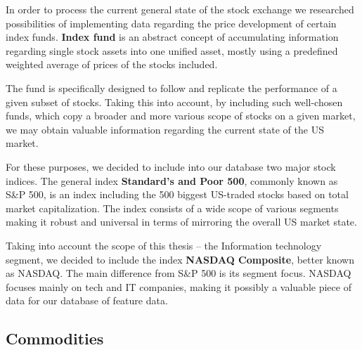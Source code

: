 In order to process the current general state of the stock exchange we researched possibilities of
implementing data regarding the price development of certain index funds. \textbf{Index fund} is an abstract 
concept of accumulating information regarding single stock assets into one unified asset, mostly using a predefined
weighted average of prices of the stocks included.
\par
The fund is specifically designed to follow and replicate the performance of a given subset of stocks. Taking this into account,
by including such well-chosen funds, which copy a broader and more various scope of stocks on a given market, we may obtain valuable
information regarding the current state of the US market.
\par
For these purposes, we decided to include into our database two major stock indices. The general index \textbf{Standard's and Poor 500}, commonly
known as S\&P 500, is an index including the 500 biggest US-traded stocks based on total market capitalization. The index consists of a wide scope of various
segments making it robust and universal in terms of mirroring the overall US market state.
\par
Taking into account the scope of this thesis – the Information technology segment, we decided to include the index \textbf{NASDAQ Composite}, better known as NASDAQ. The main
difference from S\&P 500 is its segment focus. NASDAQ focuses mainly on tech and IT companies, making it possibly a valuable piece of data for our database of feature data.  

\subsection{Commodities}

